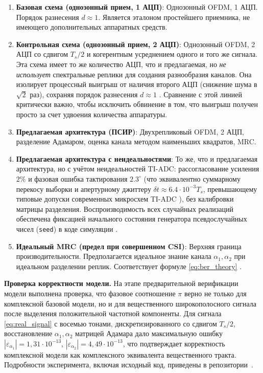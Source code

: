 \documentclass[a4paper,12pt]{article}
\numberwithin{equation}{section}
\begin{document}
\begin{enumerate}
    \item \textbf{Базовая схема (однозонный прием, 1 АЦП)}: Однозонный OFDM, 1 АЦП. Порядок разнесения $d \approx 1$. Является эталоном простейшего приемника, не имеющего дополнительных аппаратных средств.
    \item \textbf{Контрольная схема (однозонный прием, 2 АЦП)}: Однозонный OFDM, 2 АЦП со сдвигом $T_s/2$ и когерентным усреднением одного и того же сигнала. Эта схема имеет то же количество АЦП, что и предлагаемая, но \textit{не использует} спектральные реплики для создания разнообразия каналов. Она изолирует процессный выигрыш от наличия второго АЦП (снижение шума в $\sqrt{2}$ раз), сохраняя порядок разнесения $d \approx 1$ \cite{walden}. Сравнение с этой линией критически важно, чтобы исключить обвинение в том, что выигрыш получен просто за счет удвоения количества аппаратуры.
    \item \textbf{Предлагаемая архитектура (ПСИР)}: Двухрепликовый OFDM, 2 АЦП, разделение Адамаром, оценка канала методом наименьших квадратов, MRC.
    \item \textbf{Предлагаемая архитектура с неидеальностями}: То же, что и предлагаемая архитектура, но с учётом неидеальностей TI-ADC: рассогласование усиления $2\%$ и фазовая ошибка тактирования $2.3^\circ$ (что эквивалентно суммарному перекосу выборки и апертурному джиттеру $\delta t \approx 6.4{\cdot}10^{-3} T_s$, превышающему типовые допуски современных микросхем TI-ADC \cite{ieee_std,adi_mt008,razavi}), без калибровки матрицы разделения. Воспроизводимость всех случайных реализаций обеспечена фиксацией начального состояния генератора псевдослучайных чисел (\texttt{seed}) в коде симуляции \cite{github}.
    \item \textbf{Идеальный MRC (предел при совершенном CSI)}: Верхняя граница производительности. Предполагается идеальное знание канала $\alpha_1, \alpha_2$ при идеальном разделении реплик. Соответствует формуле \eqref{eq:ber_theory} \cite{proakis}.
\end{enumerate}

\textbf{Проверка корректности модели.} На этапе предварительной верификации модели выполнена проверка, что фазовое соотношение $\pi$ верно не только для комплексной базовой модели, но и для вещественного широкополосного сигнала после выделения положительной частотной компоненты. Для сигнала \eqref{eq:real_signal} с восемью тонами, дискретизированного со сдвигом $T_s/2$, восстановление $\alpha_1,\alpha_2$ матрицей Адамара дало максимальную ошибку $|\varepsilon_{\alpha_1}| = 1{,}31\cdot10^{-13}$, $|\varepsilon_{\alpha_2}| = 4{,}49\cdot10^{-13}$, что подтверждает корректность комплексной модели как комплексного эквивалента вещественного тракта. Подробности эксперимента, включая исходный код, приведены в репозитории~\cite{github}.
\end{document}
